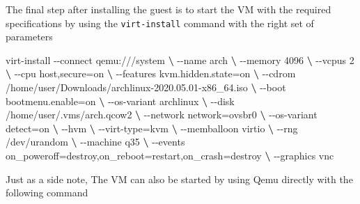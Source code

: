 \documentclass[
  14pt,
  english,
  a4paper,
]{scrreprt}
\newenvironment{Shaded}{}{}
\newcommand{\ExtensionTok}[1]{#1}
\newcommand{\KeywordTok}[1]{\textcolor[rgb]{0.00,0.44,0.13}{\textbf{#1}}}
\newcommand{\NormalTok}[1]{#1}
\begin{document}
The final step after installing the guest is to start the VM with the
required specifications by using the \texttt{virt-install} command with
the right set of parameters

\begin{Shaded}
\begin{Highlighting}[]
 \ExtensionTok{virt{-}install}\NormalTok{ {-}{-}connect qemu:///system }\KeywordTok{\textbackslash{}}
  \ExtensionTok{{-}{-}name}\NormalTok{ arch }\KeywordTok{\textbackslash{}}
  \ExtensionTok{{-}{-}memory}\NormalTok{ 4096 }\KeywordTok{\textbackslash{}}
  \ExtensionTok{{-}{-}vcpus}\NormalTok{ 2 }\KeywordTok{\textbackslash{}}
  \ExtensionTok{{-}{-}cpu}\NormalTok{ host,secure=on }\KeywordTok{\textbackslash{}}
  \ExtensionTok{{-}{-}features}\NormalTok{ kvm.hidden.state=on }\KeywordTok{\textbackslash{}}
  \ExtensionTok{{-}{-}cdrom}\NormalTok{ /home/user/Downloads/archlinux{-}2020.05.01{-}x86\_64.iso }\KeywordTok{\textbackslash{}}
  \ExtensionTok{{-}{-}boot}\NormalTok{ bootmenu.enable=on }\KeywordTok{\textbackslash{}}
  \ExtensionTok{{-}{-}os{-}variant}\NormalTok{ archlinux }\KeywordTok{\textbackslash{}}
  \ExtensionTok{{-}{-}disk}\NormalTok{ /home/user/.vms/arch.qcow2 }\KeywordTok{\textbackslash{}}
  \ExtensionTok{{-}{-}network}\NormalTok{ network=ovsbr0 }\KeywordTok{\textbackslash{}}
  \ExtensionTok{{-}{-}os{-}variant}\NormalTok{ detect=on }\KeywordTok{\textbackslash{}}
  \ExtensionTok{{-}{-}hvm} \KeywordTok{\textbackslash{}}
  \ExtensionTok{{-}{-}virt{-}type}\NormalTok{=kvm }\KeywordTok{\textbackslash{}}
  \ExtensionTok{{-}{-}memballoon}\NormalTok{ virtio }\KeywordTok{\textbackslash{}}
  \ExtensionTok{{-}{-}rng}\NormalTok{ /dev/urandom }\KeywordTok{\textbackslash{}}
  \ExtensionTok{{-}{-}machine}\NormalTok{ q35 }\KeywordTok{\textbackslash{}}
  \ExtensionTok{{-}{-}events}\NormalTok{ on\_poweroff=destroy,on\_reboot=restart,on\_crash=destroy }\KeywordTok{\textbackslash{}}
  \ExtensionTok{{-}{-}graphics}\NormalTok{ vnc}
\end{Highlighting}
\end{Shaded}

Just as a side note, The VM can also be started by using Qemu directly
with the following command
\end{document}
